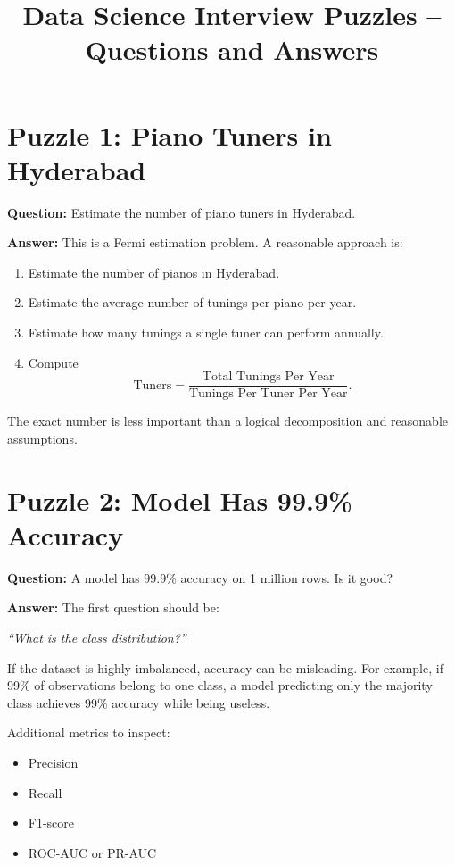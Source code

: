 \documentclass{article}
\begin{document}
\title{Data Science Interview Puzzles -- Questions and Answers}
\date{}
\maketitle

\section*{Puzzle 1: Piano Tuners in Hyderabad}

\textbf{Question:} Estimate the number of piano tuners in Hyderabad.

\textbf{Answer:}
This is a Fermi estimation problem. A reasonable approach is:
\begin{enumerate}
    \item Estimate the number of pianos in Hyderabad.
    \item Estimate the average number of tunings per piano per year.
    \item Estimate how many tunings a single tuner can perform annually.
    \item Compute
    \[
    \text{Tuners} = \frac{\text{Total Tunings Per Year}}{\text{Tunings Per Tuner Per Year}}.
    \]
\end{enumerate}
The exact number is less important than a logical decomposition and reasonable assumptions.

\section*{Puzzle 2: Model Has 99.9\% Accuracy}

\textbf{Question:} A model has 99.9\% accuracy on 1 million rows. Is it good?

\textbf{Answer:}
The first question should be:

\textit{``What is the class distribution?''}

If the dataset is highly imbalanced, accuracy can be misleading.
For example, if 99\% of observations belong to one class, a model predicting only the majority class achieves 99\% accuracy while being useless.

Additional metrics to inspect:
\begin{itemize}
    \item Precision
    \item Recall
    \item F1-score
    \item ROC-AUC or PR-AUC
\end{itemize}
\end{document}
